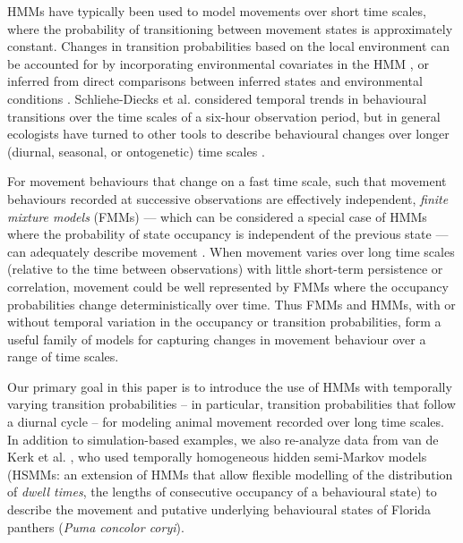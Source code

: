 \documentclass{bmcart}
\begin{document}
HMMs have typically been used to model movements over short time
scales, where the probability of transitioning between movement states is
approximately constant. Changes in transition
probabilities based on
the local environment can be accounted for by incorporating environmental
covariates in the HMM \cite{patterson_classifying_2009}, or 
inferred from direct comparisons between inferred states and environmental
conditions \cite{fryxell_multiple_2008}. Schliehe-Diecks et al. 
\cite{schliehe-diecks_application_2012}
considered temporal trends in behavioural transitions over the
time scales of a six-hour
observation period, but
in general ecologists have turned to other tools to describe behavioural
changes over longer (diurnal, seasonal, or ontogenetic) time scales \cite{gurarie2009novel}.


For movement behaviours that change on a fast time scale, such
that movement behaviours recorded
at successive observations are effectively independent,
\emph{finite mixture models} (FMMs) --- which can be considered
a special case of HMMs where the
probability of state occupancy is independent of the previous state ---
can adequately describe movement \cite{tracey_mapping_2012}.  
When movement varies over long time scales
(relative to the time between observations) with little short-term
persistence or correlation, movement could be well represented by FMMs
where the occupancy probabilities change deterministically over time.
Thus FMMs and HMMs,
with or without temporal variation in the occupancy or transition
probabilities, form a useful family of models for capturing
changes in movement behaviour over a range of time scales.


Our primary goal in this paper is to introduce the use of
HMMs with temporally varying transition probabilities -- in particular,
transition probabilities that follow a diurnal cycle -- for modeling
animal movement recorded over long time scales.  
In addition to simulation-based examples,
we also re-analyze data from 
van de Kerk et al. \cite{kerk2015hidden}, who used temporally homogeneous hidden semi-Markov
models (HSMMs: an extension of HMMs that allow
flexible modelling of the distribution of \emph{dwell times}, the 
lengths of consecutive occupancy of a behavioural state) to
describe the movement and putative underlying
behavioural states of Florida panthers (\emph{Puma concolor coryi}).
\end{document}
